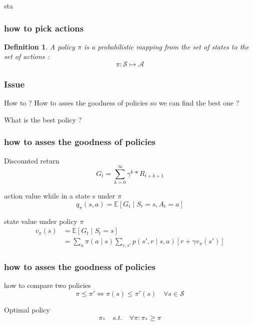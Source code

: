 sta\documentclass[dvipsnames,svgnames]{beamer}
\newtheorem{madef}{Definition}
\begin{document}
\begin{frame}
\frametitle{how to pick actions}
\begin{madef}
A \emph{policy} $\pi$ is a probabilistic mapping from the set of states to the set of actions : 
$$ \pi : \mathcal{S} \mapsto \mathcal{A} $$

\end{madef}
\end{frame}

\begin{frame}
\frametitle{Issue}
\begin{alertblock}{How to ?}
How to asses the goodness of policies so we can find the best one ? 

What is the best policy ?
\end{alertblock}
\end{frame}

\begin{frame}
\frametitle{how to asses the goodness of policies}
\begin{block}{Discounted return}
$$ G_t= \sum_{k=0}^{\infty}\gamma^k * R_{t+k+1}$$
\end{block}

\pause
\begin{block}{action value while in a state s under $\pi$}
\begin{equation}
q_{\pi}(s,a) = \mathbb{E}[G_t\mid S_t =s,A_t=a]
\end{equation}
\end{block}

\pause
\begin{block}{state value under policy $\pi$}
\begin{equation}
\begin{split}
v_{\pi}(s)&=\mathbb{E}[G_t \mid S_t=s] 
\\& = \sum_{a}\pi(a\mid s)\sum_{r,s'}p(s',r\mid s,a)[r+\gamma v_{\pi}(s')]
\end{split}
\end{equation}
\end{block}



\end{frame}

\begin{frame}
\frametitle{how to asses the goodness of policies}
\begin{block}{how to compare two policies}
$$ \pi \leq \pi ' \iff  \pi (s)\leq \pi ' (s) \quad \forall s \in \mathcal{S}
$$
\end{block}

\pause 

\begin{block}{Optimal policy}
$$ \pi_{*} \quad s.t. \quad \forall \pi : \pi_{*}\geq \pi $$
\end{block}
\end{frame}
\end{document}
